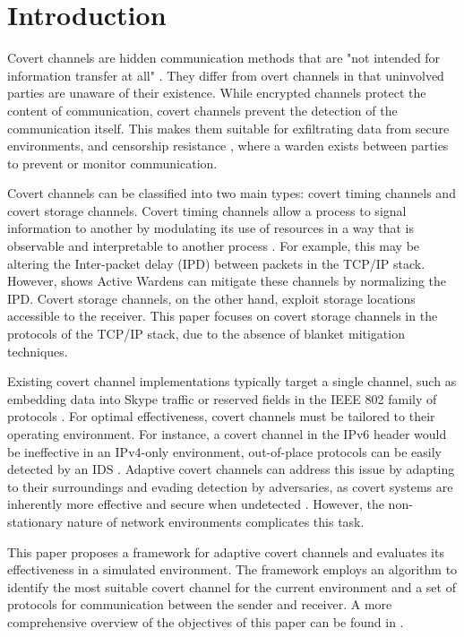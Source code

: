 \chapter{Introduction}
\label{ch:introduction}

Covert channels are hidden communication methods that are "not intended for information transfer at all" \cite{ANOTCP}. They differ from overt channels in that uninvolved parties are unaware of their existence. While encrypted channels protect the content of communication, covert channels prevent the detection of the communication itself. This makes them suitable for exfiltrating data from secure environments, and censorship resistance \citep{TWACCS}, where a warden exists between parties to prevent or monitor communication.

Covert channels can be classified into two main types: covert timing channels and covert storage channels. Covert timing channels allow a process to signal information to another by modulating its use of resources in a way that is observable and interpretable to another process \citep{TCSEC}. For example, this may be altering the Inter-packet delay (IPD) between packets in the TCP/IP stack. However, \cite{DIAWAPSCC} shows Active Wardens can mitigate these channels by normalizing the IPD. Covert storage channels, on the other hand, exploit storage locations accessible to the receiver. This paper focuses on covert storage channels in the protocols of the TCP/IP stack, due to the absence of blanket mitigation techniques.

Existing covert channel implementations typically target a single channel, such as embedding data into Skype traffic \citep{DAMBCTCST} or reserved fields in the IEEE 802 family of protocols \citep{CCiLANP}. For optimal effectiveness, covert channels must be tailored to their operating environment. For instance, a covert channel in the IPv6 header would be ineffective in an IPv4-only environment, out-of-place protocols can be easily detected by an IDS \citep{TWACCS}. Adaptive covert channels can address this issue by adapting to their surroundings and evading detection by adversaries, as covert systems are inherently more effective and secure when undetected \citep{GUCCA}. However, the non-stationary nature of network environments \citep{PNFD} complicates this task.

This paper proposes a framework for adaptive covert channels and evaluates its effectiveness in a simulated environment. The framework employs an algorithm to identify the most suitable covert channel for the current environment and a set of protocols for communication between the sender and receiver. A more comprehensive overview of the objectives of this paper can be found in .
